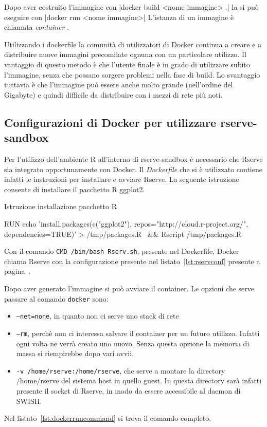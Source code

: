 \documentclass[10pt,titlepage,twoside,a4paper]{report}
\newenvironment{code}{\singlespacing\captionsetup{type=listing}}{}
\begin{document}
Dopo aver costruito l'immagine con |docker build <nome 
immagine> .|
la si può eseguire con |docker run <nome immagine>|
L'istanza di un immagine è chiamata \emph{container} 
\cite{DockerfileReference}.

Utilizzando i dockerfile la comunità di utilizzatori di Docker continua a 
creare e a distribuire nuove immagini precomilate ognuna con un particolare 
utilizzo.
Il vantaggio di questo metodo è che l'utente finale è in grado di utilizzare 
subito l'immagine, senza che possano sorgere problemi nella fase di build. Lo 
svantaggio tuttavia è che l'immagine può  essere anche molto grande 
(nell'ordine del Gigabyte) e quindi difficile da distribuire con i mezzi di 
rete più noti.

    \subsection{Configurazioni di Docker per utilizzare rserve-sandbox}
Per l'utilizzo dell'ambiente R all'interno di rserve-sandbox è necessario che 
Rserve sia integrato opportunamente con Docker. Il \emph{Dockerfile} che si 
è utilizzato contiene infatti le instruzioni per installare e avviare Rserve.
La seguente istruzione consente di installare il pacchetto R ggplot2.

\begin{code}
    \caption{Istruzione installazione pacchetto R}
    \begin{shellcode*}{}
RUN echo 'install.packages(c("ggplot2"), repos="http://cloud.r-project.org/", dependencies=TRUE)' > /tmp/packages.R \
    && Rscript /tmp/packages.R
    \end{shellcode*}
\end{code}

Con il comando \texttt{CMD /bin/bash Rserv.sh}, presente nel 
Dockerfile,
Docker chiama Rserve con la configurazione presente nel 
listato~\ref{lst:rservconf} presente a pagina~\pageref{lst:rservconf}.

Dopo aver generato l'immagine si può avviare il container.
Le opzioni che serve passare al comando \texttt{docker} sono:
\begin{itemize}
    \item  \texttt{--net=none}, in quanto non ci serve uno stack di rete
    \item  \texttt{--rm}, perchè non ci interessa salvare il container per
           un futuro utilizzo. Infatti ogni volta ne verrà creato uno nuovo.
           Senza questa opzione la memoria di massa si riempirebbe dopo
           vari avvii.
    \item  \texttt{-v /home/rserve:/home/rserve}, che serve a montare 
           la directory /home/rserve del sistema host in quello guest.
           In questa directory sarà infatti presente il socket di Rserve,
           in modo da essere accessibile al daemon di SWISH.
\end{itemize}
Nel listato~\ref{lst:dockerruncommand} si trova il comando completo.
\end{document}
